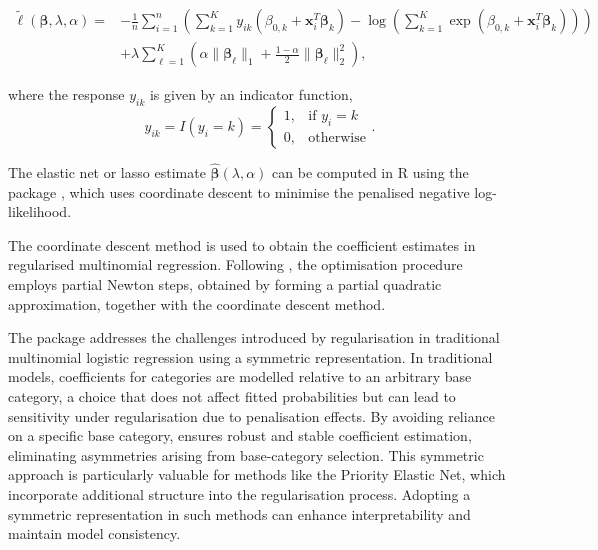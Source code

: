 \begin{equation}
\label{eq:multinomial_elastic}
\begin{split}
\tilde{\ell}(\boldsymbol{\beta}, \lambda, \alpha) =& -\frac{1}{n} \sum_{i=1}^{n} \left( \sum_{k=1}^{K} y_{ik} \left( \beta_{0,k} + \mathbf{x}_i^T \boldsymbol{\beta}_k \right) - \log \left( \sum_{k=1}^{K} \exp(\beta_{0,k} + \mathbf{x}_i^T \boldsymbol{\beta}_k) \right) \right)\\
&+ \lambda \sum_{\ell=1}^{K} \left( \alpha \|\boldsymbol{\beta}_{\ell}\|_1 + \frac{1 - \alpha}{2} \|\boldsymbol{\beta}_{\ell}\|_2^2 \right),
\end{split}
\end{equation}

where the response $y_{ik}$ is given by an indicator function,
\[
y_{ik} = I(y_i = k) = \begin{cases} 
1, & \text{if } y_i = k \\
0, & \text{otherwise}
\end{cases}.
\]

\normalsize %

The elastic net or lasso estimate $\hat{\boldsymbol{\beta}}(\lambda, \alpha)$ can be computed in R using the  package \citep{friedman2023glmnet}, which uses coordinate descent to minimise the penalised negative log-likelihood.

The coordinate descent method is used to obtain the coefficient estimates in regularised multinomial regression. Following \citet{friedman2010regularization}, the optimisation procedure employs partial Newton steps, obtained by forming a partial quadratic approximation, together with the coordinate descent method.

The  package addresses the challenges introduced by regularisation in traditional multinomial logistic regression using a symmetric representation. In traditional models, coefficients for categories are modelled relative to an arbitrary base category, a choice that does not affect fitted probabilities but can lead to sensitivity under regularisation due to penalisation effects. By avoiding reliance on a specific base category,  ensures robust and stable coefficient estimation, eliminating asymmetries arising from base-category selection. This symmetric approach is particularly valuable for methods like the Priority Elastic Net, which incorporate additional structure into the regularisation process. Adopting a symmetric representation in such methods can enhance interpretability and maintain model consistency.

